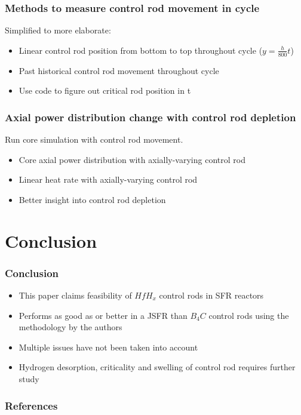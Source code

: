 \documentclass[9pt]{beamer}
\newcommand{\hfh}{$HfH_{x}$\xspace}
\newcommand{\bc}{$B_4C$\xspace}
\begin{document}
\begin{frame}
\frametitle{Methods to measure control rod movement in cycle}
Simplified to more elaborate:
\begin{itemize}
  \item Linear control rod position from bottom to top throughout cycle ($y = \frac{h}{800}t $)
  \item Past historical control rod movement throughout cycle
  \item Use code to figure out critical rod position in t
\end{itemize}
\end{frame}


\begin{frame}
\frametitle{Axial power distribution change with control rod depletion}
Run core simulation with control rod movement.
\begin{itemize}
    \item Core axial power distribution with axially-varying control rod
    \item Linear heat rate with axially-varying control rod
    \item Better insight into control rod depletion
\end{itemize}
\end{frame}

\section{Conclusion}
\begin{frame}
\frametitle{Conclusion}
\begin{itemize}
    \item This paper claims feasibility of \hfh control rods in \gls{SFR} reactors
    \item Performs as good as or better in a \gls{JSFR} than \bc control rods using the methodology by the authors
    \item Multiple issues have not been taken into account
    \item Hydrogen desorption, criticality and swelling of control rod requires further study
\end{itemize}
\end{frame}

\begin{frame}[allowframebreaks]
  \frametitle{References}
  
  {\footnotesize  }
\end{frame}
\end{document}
